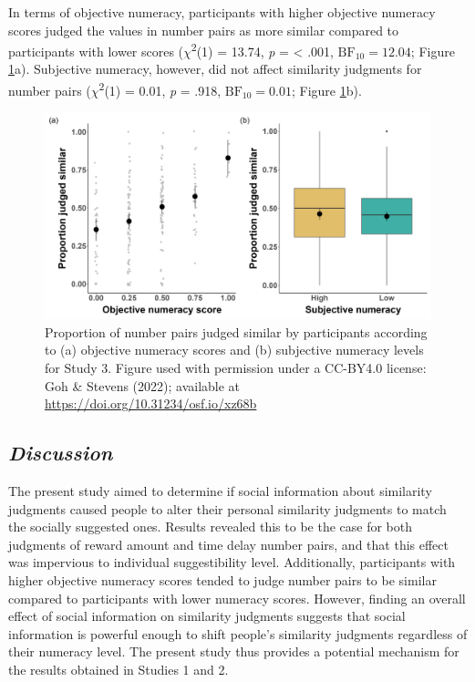 \documentclass[
  pub,floatsintext]{apa6}
\begin{document}
In terms of objective numeracy, participants with higher objective numeracy scores judged the values in number pairs as more similar compared to participants with lower scores (\(\chi\)\textsuperscript{2}(1) = 13.74, \emph{p} = \textless{} .001, \(\mathrm{BF}_{\textrm{10}} = 12.04\); Figure \ref{fig:numeracyjudgments3}a). Subjective numeracy, however, did not affect similarity judgments for number pairs (\(\chi\)\textsuperscript{2}(1) = 0.01, \emph{p} = .918, \(\mathrm{BF}_{\textrm{10}} = 0.01\); Figure \ref{fig:numeracyjudgments3}b).



\begin{figure}

{\centering \includegraphics[width=0.8\linewidth]{figures/numeracy_judgments_3} 

}

\caption{Proportion of number pairs judged similar by participants according to (a) objective numeracy scores and (b) subjective numeracy levels for Study 3. Figure used with permission under a CC-BY4.0 license: Goh \& Stevens (2022); available at \url{https://doi.org/10.31234/osf.io/xz68b}}\label{fig:numeracyjudgments3}
\end{figure}

\hypertarget{discussion-2}{%
\subsection{\texorpdfstring{\emph{Discussion}}{Discussion}}\label{discussion-2}}

The present study aimed to determine if social information about similarity judgments caused people to alter their personal similarity judgments to match the socially suggested ones. Results revealed this to be the case for both judgments of reward amount and time delay number pairs, and that this effect was impervious to individual suggestibility level. Additionally, participants with higher objective numeracy scores tended to judge number pairs to be similar compared to participants with lower numeracy scores. However, finding an overall effect of social information on similarity judgments suggests that social information is powerful enough to shift people's similarity judgments regardless of their numeracy level. The present study thus provides a potential mechanism for the results obtained in Studies 1 and 2.
\end{document}
